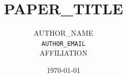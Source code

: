 \documentclass[11pt,a4paper]{article}
\title{{PAPER_TITLE}}
\author{{AUTHOR_NAME} \\
       \texttt{{AUTHOR_EMAIL}} \\
       {AFFILIATION}}
\date{\today}
\begin{document}
\maketitle

\begin{abstract}
\end{abstract}











\end{document}
